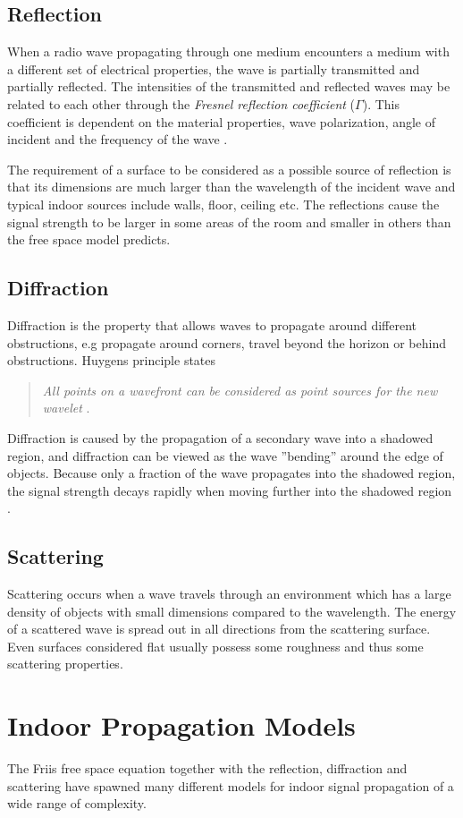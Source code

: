 \documentclass{LTHthesis}
\begin{document}
\subsection{Reflection}
%
When a radio wave propagating through one medium encounters a medium with a different set of electrical properties, the wave is partially transmitted and partially reflected. The intensities of the transmitted and reflected waves may be related to each other through the \emph{Fresnel reflection coefficient} ($\Gamma$). This coefficient is dependent on the material properties, wave polarization, angle of incident and the frequency of the wave \cite{rappaport96}.

The requirement of a surface to be considered as a possible source of reflection is that its dimensions are much larger than the wavelength of the incident wave and typical indoor sources include walls, floor, ceiling etc. The reflections cause the signal strength to be larger in some areas of the room and smaller in others than the free space model predicts.
%
\subsection{Diffraction}
%
Diffraction is the property that allows waves to propagate around different obstructions, e.g propagate  around corners, travel beyond the horizon or behind obstructions. Huygens principle states 
\begin{quote}
 \emph{All points on a wavefront can be considered as point sources for the new wavelet} \cite{rappaport96}.
 \end{quote}
%
Diffraction is caused by the propagation of a secondary wave into a shadowed region, and diffraction can be viewed as the wave ''bending'' around the edge of objects. Because only a fraction of the wave propagates into the shadowed region, the signal strength decays rapidly when moving further into the shadowed region \cite{rappaport96}.
%
\subsection{Scattering}
%
Scattering occurs when a wave travels through an environment which has a large density of objects with small dimensions compared to the wavelength. The energy of a scattered wave is spread out in all directions from the scattering surface. Even surfaces considered flat usually possess some roughness and thus some scattering properties.
%
\section{Indoor Propagation Models}
%
The Friis free space equation together with the reflection, diffraction and scattering have spawned many different models for indoor signal propagation of a wide range of complexity.
%
\end{document}
